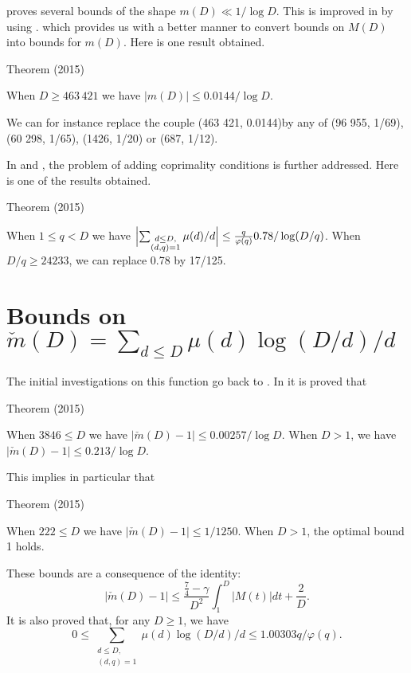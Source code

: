 \cite{Ramare*12-2} proves several
bounds of the shape $m(D)\ll 1/\log D$.
This is improved in
\cite{Ramare*12-5} by using
\cite{Balazard*12}.
which provides us with a better manner to convert bounds on $M(D)$
into bounds for $m(D)$. Here is one result obtained.

\begin{thm}{Theorem (2015)}

When $D\ge 463\,421$ we have $|m(D)|\le 0.0144/\log D$.
\par 
  We can for instance replace the couple  (463 421, 0.0144)by
any of  (96 955, 1/69), (60 298, 1/65), (1426, 1/20)
or (687, 1/12).
\end{thm}



In
\cite{Ramare*12-3} and
\cite{Ramare*12-5}, the
problem of adding coprimality conditions is further addressed.
Here is one of the results obtained.
\begin{thm}{Theorem (2015)}

  When $1\le q < D$ we have
  $\Bigl|\sum_{\substack{d\le D,\\ (d,q)=1}}\mu(d)/d\Bigr|\le
   \frac{q}{\varphi(q)}0.78/\log(D/q)$. When $D/q\ge 24233$, we can
  replace 0.78 by 17/125. 
\end{thm}




\section{Bounds on $\check{m}(D)=\sum_{d\le D}\mu(d)\log(D/d)/d$}


The initial investigations on this function go back to 
 \cite{vonSterneck*02}.
In \cite{Ramare*12-5} it is
proved that
\begin{thm}{Theorem (2015)}

  When $3846 \le D$ we have
  $|\check{m}(D)-1|\le 0.00257/\log D$.
  When $D > 1$, we have
    $|\check{m}(D)-1|\le 0.213/\log D$.
\end{thm}


This implies in particular that
\begin{thm}{Theorem (2015)}

  When $222 \le D$ we have
  $|\check{m}(D)-1|\le 1/1250$.
  When $D > 1$, the optimal bound 1 holds.
\end{thm}


These bounds are a consequence of the identity:
$$
|\check{m}(D)-1|\le \frac{\frac74-\gamma}{D^2}\int_1^D|M(t)|dt+\frac{2}{D}.
$$
It is also proved that, for any $D\ge1$, we have
$$
0\le \sum_{\substack{d\le D,\\ (d,q)=1}}\mu(d)\log(D/d)/d
\le 1.00303 q/\varphi(q).
$$


